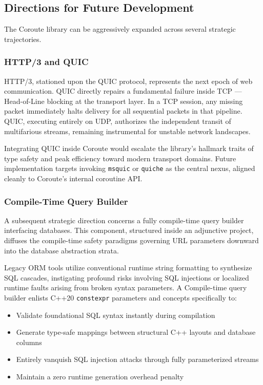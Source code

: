 \subsection{Directions for Future Development}

The Coroute library can be aggressively expanded across several strategic trajectories.

\subsubsection{HTTP/3 and QUIC}

HTTP/3, stationed upon the QUIC protocol, represents the next epoch of web communication. QUIC directly repairs a fundamental failure inside TCP --- Head-of-Line blocking at the transport layer. In a TCP session, any missing packet immediately halts delivery for all sequential packets in that pipeline. QUIC, executing entirely on UDP, authorizes the independent transit of multifarious streams, remaining instrumental for unstable network landscapes.

Integrating QUIC inside Coroute would escalate the library's hallmark traits of type safety and peak efficiency toward modern transport domains. Future implementation targets invoking \texttt{msquic} or \texttt{quiche} as the central nexus, aligned cleanly to Coroute's internal coroutine API.

\subsubsection{Compile-Time Query Builder}

A subsequent strategic direction concerns a fully compile-time query builder interfacing databases. This component, structured inside an adjunctive project, diffuses the compile-time safety paradigms governing URL parameters downward into the database abstraction strata.

Legacy ORM tools utilize conventional runtime string formatting to synthesize SQL cascades, instigating profound risks involving SQL injections or localized runtime faults arising from broken syntax parameters. A Compile-time query builder enlists C++20 \texttt{constexpr} parameters and concepts specifically to:
\begin{itemize}
    \item Validate foundational SQL syntax instantly during compilation
    \item Generate type-safe mappings between structural C++ layouts and database columns
    \item Entirely vanquish SQL injection attacks through fully parameterized streams
    \item Maintain a zero runtime generation overhead penalty
\end{itemize}

